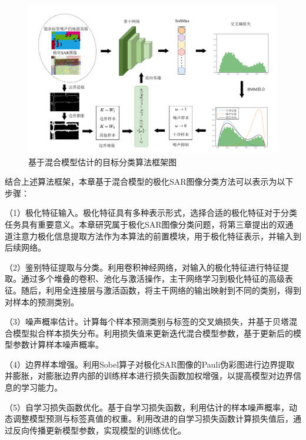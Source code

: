 \begin{figure}[ht!]
    \centering
    \includegraphics[width=14cm]{pic/chapter4/标签噪声鲁棒分类方法.pdf}
    \caption{基于混合模型估计的目标分类算法框架图}
    \label{BBM_framework}
\end{figure}

结合上述算法框架，本章基于混合模型的极化SAR图像分类方法可以表示为以下步骤：

（1）极化特征输入。极化特征具有多种表示形式，选择合适的极化特征对于分类任务具有重要意义。本章研究属于极化SAR图像分类问题，将第三章提出的双通道注意力极化信息提取方法作为本算法的前置模块，用于极化特征表示，并输入到后续网络。

（2）鉴别特征提取与分类。利用卷积神经网络，对输入的极化特征进行特征提取。通过多个堆叠的卷积、池化与激活操作，主干网络学习到极化特征的高级表征。随后，利用全连接层与激活函数，将主干网络的输出映射到不同的类别，得到对样本的预测类别。

（3）噪声概率估计。计算每个样本预测类别与标签的交叉熵损失，并基于贝塔混合模型拟合样本损失分布。利用损失值来更新迭代混合模型参数，基于更新后的模型参数计算样本噪声概率。

（4）边界样本增强。利用Sobel算子对极化SAR图像的Pauli伪彩图进行边界提取并膨胀，对膨胀边界内部的训练样本进行损失函数加权增强，以提高模型对边界信息的学习能力。

（5）自学习损失函数优化。基于自学习损失函数，利用估计的样本噪声概率，动态调整模型预测与标签真值的权重。利用改进的自学习损失函数计算损失值后，通过反向传播更新模型参数，实现模型的训练优化。

